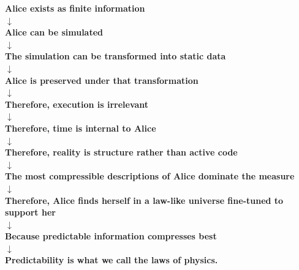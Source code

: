 \vspace{1.5em}
\begin{center}
    \sffamily
    \textbf{Alice exists as finite information} \\
    $\downarrow$ \\
    \textbf{Alice can be simulated} \\
    $\downarrow$ \\
    \textbf{The simulation can be transformed into static data} \\
    $\downarrow$ \\
    \textbf{Alice is preserved under that transformation} \\
    $\downarrow$ \\
    \textbf{Therefore, execution is irrelevant} \\
    $\downarrow$ \\
    \textbf{Therefore, time is internal to Alice} \\
    $\downarrow$ \\
    \textbf{Therefore, reality is structure rather than active code} \\
    $\downarrow$ \\
    \textbf{The most compressible descriptions of Alice dominate the measure} \\
    $\downarrow$ \\
    \textbf{Therefore, Alice finds herself in a law-like universe fine-tuned to support her} \\
    $\downarrow$ \\
    \textbf{Because predictable information compresses best} \\
    $\downarrow$ \\
    \textbf{Predictability is what we call the laws of physics.}
\end{center}
